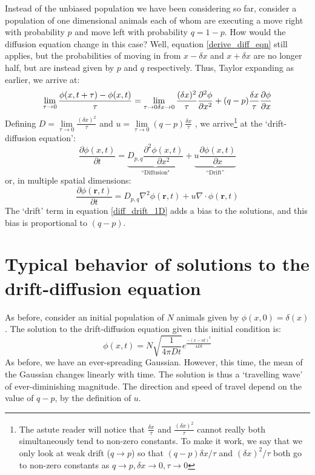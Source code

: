 Instead of the unbiased population we have been considering so far, consider a population of one dimensional animals each of whom are executing a  move right with probability $p$ and move left with probability $q = 1-p$. How would the diffusion equation change in this case?
Well, equation \eqref{derive_diff_eqn} still applies, but the probabilities of moving in from $x-\delta x$ and $x + \delta x$ are no longer half, but are instead given by $p$ and $q$ respectively. Thus, Taylor expanding as earlier, we arrive at:
\begin{equation*}
	\lim_{\tau \to 0}\frac{\phi(x,t+\tau) - \phi(x,t)}{\tau} = \lim_{\tau \to 0\\\delta x \to 0} \frac{(\delta x)^2}{\tau}\frac{\partial^2\phi}{\partial x^2} + (q-p)\frac{\delta x}{\tau}\frac{\partial \phi}{\partial x}
\end{equation*}
Defining $D = \lim\limits_{\tau \to 0} \frac{(\delta x)^2}{\tau}$ and $u = \lim\limits_{\tau \to 0} (q-p)\frac{\delta x}{\tau}$ , we arrive\footnote{The astute reader will notice that $\frac{\delta x}{\tau}$ and  $\frac{(\delta x)^2}{\tau}$ cannot really both simultaneously tend to non-zero constants. To make it work, we  say that we only look at weak drift ($q \to p$) so that $(q-p)\delta x /\tau$ and $(\delta x)^2/\tau$ both go to non-zero constants as $q\to p, \delta x \to 0, \tau \to 0$} at the `drift-diffusion equation':
\begin{equation}
	\label{diff_drift_1D}
	\frac{\partial \phi(x,t)}{\partial t} = \underbrace{D_{p,q}\frac{\partial^2\phi(x,t)}{\partial x^2}}_{\text{``Diffusion"}} + \underbrace{u\frac{\partial \phi(x,t)}{\partial x}}_{\text{``Drift''}}
\end{equation}
or, in multiple spatial dimensions:
\begin{equation}
	\label{diff_drift_3D}
	\boxed{\frac{\partial \phi(\mathbf{r},t)}{\partial t} = D_{p,q}\nabla^2\phi(\mathbf{r},t) + u\nabla\cdot\phi(\mathbf{r},t)}
\end{equation}
The `drift' term in equation \eqref{diff_drift_1D} adds a bias to the solutions, and this bias is proportional to $(q-p)$.

\section{Typical behavior of solutions to the drift-diffusion equation}

As before, consider an initial population of $N$ animals given by $\phi(x,0) = \delta(x)$. The solution to the drift-diffusion equation given this initial condition is:
\begin{equation*}
	\phi(x,t) = N\sqrt{\frac{1}{4\pi D t}}e^{\frac{-(x-ut)^2}{4Dt}}
\end{equation*}
As before, we have an ever-spreading Gaussian. However, this time, the mean of the Gaussian changes linearly with time. The solution is thus a `travelling wave' of ever-diminishing magnitude. The direction and speed of travel depend on the value of $q-p$, by the definition of $u$.